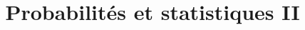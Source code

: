 \documentclass[a4paper, 12pt]{report}
\title{Probabilités et statistiques II}
\author{}
\begin{document}
\maketitle

\begin{abstract}

\end{abstract}

\tableofcontents




\end{document}
